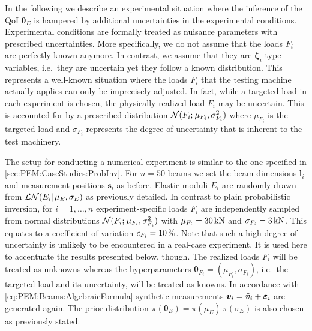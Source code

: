 In the following we describe an experimental situation where the inference of the QoI \(\bm{\theta}_E\) is hampered by additional uncertainties in the experimental conditions.
Experimental conditions are formally treated as nuisance parameters with prescribed uncertainties.
More specifically, we do not assume that the loads \(F_i\) are perfectly known anymore.
In contrast, we assume that they are \(\bm{\zeta}_i\)-type variables, i.e.\ they are uncertain yet they follow a known distribution.
This represents a well-known situation where the loads \(F_i\) that the testing machine actually applies can only be imprecisely adjusted.
In fact, while a targeted load in each experiment is chosen, the physically realized load \(F_i\) may be uncertain.
This is accounted for by a prescribed distribution \(\mathcal{N}(F_i ;{\:\!} \mu_{F_i},\sigma_{F_i}^2)\)
where \(\mu_{F_i}\) is the targeted load and \(\sigma_{F_i}\) represents the degree of uncertainty that is inherent to the test machinery.
\par %
The setup for conducting a numerical experiment is similar to the one specified in \cref{sec:PEM:CaseStudies:ProbInv}.
For \(n=50\) beams we set the beam dimensions \(\bm{l}_i\) and measurement positions \(\bm{s}_i\) as before.
Elastic moduli \(E_i\) are randomly drawn from \(\mathcal{LN}(E_i {\:\!}|{\:\!} \mu_E,\sigma_E)\) as previously detailed.
In contrast to plain probabilistic inversion, for \(i=1,\ldots,n\) experiment-specific loads \(F_i\) are independently sampled from
normal distributions \(\mathcal{N}(F_i ;{\:\!} \mu_{F_i},\sigma_{F_i}^2)\) with \(\mu_{F_i} = \unit[30]{kN}\) and \(\sigma_{F_i} = \unit[3]{kN}\).
This equates to a coefficient of variation \(c_{F_i} = \unit[10]{\%}\).
Note that such a high degree of uncertainty is unlikely to be encountered in a real-case experiment.
It is used here to accentuate the results presented below, though.
The realized loads \(F_i\) will be treated as unknowns whereas the hyperparameters \(\bm{\theta}_{F_i} = (\mu_{F_i},\sigma_{F_i})\), i.e.\ the targeted load and its uncertainty, will be treated as knowns.
In accordance with \cref{eq:PEM:Beams:AlgebraicFormula} synthetic measurements \(\bm{v}_i = \tilde{\bm{v}}_i + \bm{\varepsilon}_i\) are generated again.
The prior distribution \(\pi(\bm{\theta}_E) = \pi(\mu_E) \, \pi(\sigma_E)\) is also chosen as previously stated.
\par %
